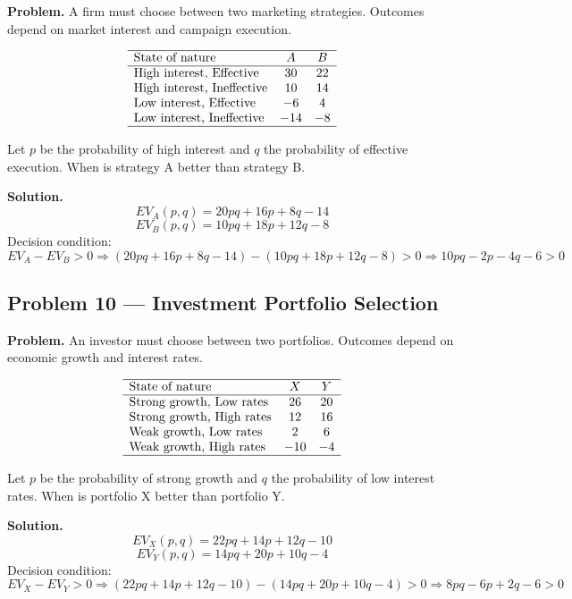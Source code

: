 \begin{ExamProblems}
		\textbf{Problem.}
		A firm must choose between two marketing strategies. Outcomes depend on market interest
		and campaign execution.
		
		\[
		\begin{array}{lcc}
		\hline
		\text{State of nature} & A & B \\
		\hline
		\text{High interest, Effective} & 30 & 22 \\
		\text{High interest, Ineffective} & 10 & 14 \\
		\text{Low interest, Effective} & -6 & 4 \\
		\text{Low interest, Ineffective} & -14 & -8 \\
		\hline
		\end{array}
		\]
		
		Let \(p\) be the probability of high interest and \(q\) the probability of effective execution.  
		When is strategy A better than strategy B.
		
		\textbf{Solution.}
		\[
		EV_A(p,q)=20pq+16p+8q-14
		\]
		\[
		EV_B(p,q)=10pq+18p+12q-8
		\]
		Decision condition:
		\[
		EV_A-EV_B>0
		\Rightarrow (20pq+16p+8q-14)-(10pq+18p+12q-8)>0
		\Rightarrow 10pq-2p-4q-6>0
		\]
		
		\hypertarget{c7-ex10}{}
		\item
		\subsection*{Problem 10 — Investment Portfolio Selection}
		
		\textbf{Problem.}
		An investor must choose between two portfolios. Outcomes depend on economic growth
		and interest rates.
		
		\[
		\begin{array}{lcc}
		\hline
		\text{State of nature} & X & Y \\
		\hline
		\text{Strong growth, Low rates} & 26 & 20 \\
		\text{Strong growth, High rates} & 12 & 16 \\
		\text{Weak growth, Low rates} & 2 & 6 \\
		\text{Weak growth, High rates} & -10 & -4 \\
		\hline
		\end{array}
		\]
		
		Let \(p\) be the probability of strong growth and \(q\) the probability of low interest rates.  
		When is portfolio X better than portfolio Y.
		
		\textbf{Solution.}
		\[
		EV_X(p,q)=22pq+14p+12q-10
		\]
		\[
		EV_Y(p,q)=14pq+20p+10q-4
		\]
		Decision condition:
		\[
		EV_X-EV_Y>0
		\Rightarrow (22pq+14p+12q-10)-(14pq+20p+10q-4)>0
		\Rightarrow 8pq-6p+2q-6>0
		\]
	\end{ExamProblems}


